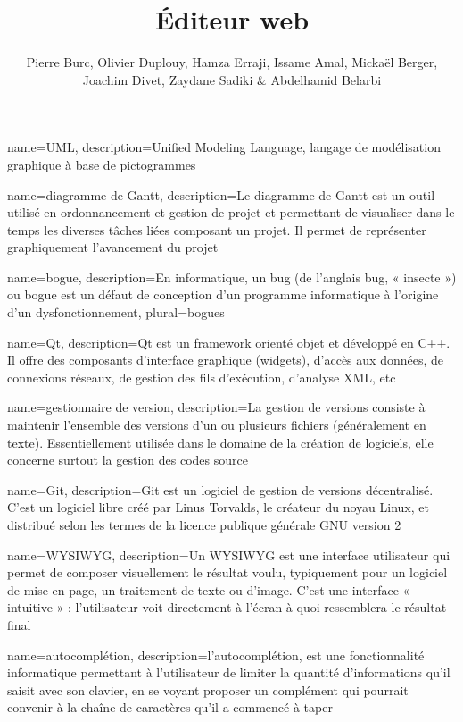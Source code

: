 \documentclass[a4paper, 12pt]{report}
\title{Éditeur web}
\author{Pierre Burc, Olivier Duplouy, Hamza Erraji, Issame Amal, Mickaël Berger, Joachim Divet, Zaydane Sadiki & Abdelhamid Belarbi}
\begin{document}
	{
		name={UML},
		description={Unified Modeling Language, langage de modélisation graphique à base de pictogrammes}
	}

	{
		name={diagramme de Gantt},
		description={Le diagramme de Gantt est un outil utilisé en ordonnancement et gestion de projet et permettant de visualiser dans le temps
		les diverses tâches liées composant un projet. Il permet de représenter graphiquement l'avancement du projet}
	}
	
	{
		name={bogue},
		description={En informatique, un bug (de l’anglais bug, « insecte ») ou bogue est un défaut de conception d'un programme
		informatique à l'origine d'un dysfonctionnement},
		plural={bogues}
	}
		
	{
		name={Qt},
		description={Qt est un framework orienté objet et développé en C++. Il offre des composants d'interface graphique (widgets),
		d'accès aux données, de connexions réseaux, de gestion des fils d'exécution, d'analyse XML, etc}
	}

	{
		name={gestionnaire de version},
		description={La gestion de versions consiste à maintenir l'ensemble des versions d'un ou plusieurs fichiers (généralement en texte).
		Essentiellement utilisée dans le domaine de la création de logiciels, elle concerne surtout la gestion des codes source}
	}

	{
		name={Git},
		description={Git est un logiciel de gestion de versions décentralisé. 
		C'est un logiciel libre créé par Linus Torvalds, le créateur du noyau Linux, et distribué selon les termes de la licence 
		publique générale GNU version 2}
	}

	{
		name={WYSIWYG},
		description={Un WYSIWYG est une interface utilisateur qui permet de composer visuellement le résultat voulu, typiquement 
		pour un logiciel de mise en page, un traitement de texte ou d’image. 
		C'est une interface « intuitive » : l’utilisateur voit directement à l’écran à quoi ressemblera le résultat final}
	}
	
	{
		name={autocomplétion},
		description={l'autocomplétion, est une fonctionnalité informatique permettant à l'utilisateur de limiter la quantité d'informations 
		qu'il saisit avec son clavier, en se voyant proposer un complément qui pourrait convenir à la chaîne de caractères qu'il a commencé à taper}
	}
\end{document}
